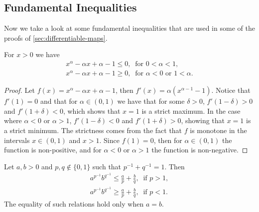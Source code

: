 \subsection{Fundamental Inequalities}

Now we take a look at some fundamental inequalities that are used in some of the
proofs of \cref{sec:differentiable-maps}.

\begin{lemma}\label{lem: CI}
  For \(x > 0\) we have
  \begin{gather}
    \label{eq: CI-1}
    x^\alpha - \alpha x + \alpha - 1 \leq 0,\ \text{ for } 0 < \alpha < 1, \\
    \label{eq: CI-2}
    x^\alpha - \alpha x + \alpha - 1 \geq 0,\ \text{ for } \alpha < 0 \text{ or
    } 1 < \alpha.
  \end{gather}
\end{lemma}

\begin{proof}
  Let \(f(x) = x^\alpha - \alpha x + \alpha - 1\), then \(f'(x) =
  \alpha(x^{\alpha - 1} - 1)\). Notice that \(f'(1) = 0\) and that for \(\alpha
  \in (0, 1)\) we have that for some \(\delta > 0\), \(f'(1 - \delta) > 0\) and
  \(f'(1 + \delta) < 0\), which shows that \(x = 1\) is a strict maximum. In the
  case where \(\alpha < 0\) or \(\alpha > 1\), \(f'(1 - \delta) < 0\) and \(f'(1
  + \delta) > 0\), showing that \(x = 1\) is a strict minimum. The strictness
  comes from the fact that \(f\) is monotone in the intervals \(x \in (0, 1)\)
  and \(x > 1\). Since \(f(1) = 0\), then for \(\alpha \in (0, 1)\) the function
  is non-positive, and for \(\alpha < 0\) or \(\alpha > 1\) the function is
  non-negative.
\end{proof}

\begin{proposition}\label{prop: young-ineq}
  Let \(a, b >0\) and \(p, q \not\in \{0, 1\}\) such that \(p^{-1} + q^{-1} =
  1\). Then
  \begin{gather}
    \label{eq: young-1}
    a^{p^{-1}} b^{q^{-1}} \leq \frac a p  + \frac b q,\ \text{ if } p > 1,
    \\
    \label{eq: young-2}
    a^{p^{-1}} b^{q^{-1}} \geq \frac a p  + \frac b q,\ \text{ if } p < 1.
  \end{gather}
  The equality of such relations hold only when \(a = b\).
\end{proposition}


